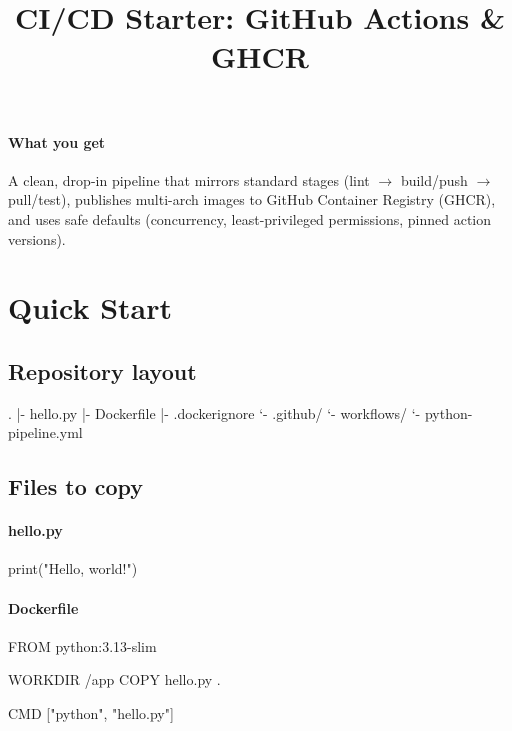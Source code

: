 \documentclass[11pt]{article}
\title{\textbf{CI/CD Starter: GitHub Actions \& GHCR}}
\author{}
\date{}
\begin{document}
\maketitle

\paragraph{What you get}
A clean, drop-in pipeline that mirrors standard stages (lint $\rightarrow$ build/push $\rightarrow$ pull/test), publishes multi-arch images to GitHub Container Registry (GHCR), and uses safe defaults (concurrency, least-privileged permissions, pinned action versions).

\section{Quick Start}

\subsection*{Repository layout}

\begin{mdframed}[style=codebox]
\begin{bashcode}
.
|- hello.py
|- Dockerfile
|- .dockerignore
`- .github/
   `- workflows/
      `- python-pipeline.yml
\end{bashcode}
\end{mdframed}

\subsection*{Files to copy}

\paragraph{hello.py}
\begin{mdframed}[style=codebox]
\begin{pythoncode}
print("Hello, world!")
\end{pythoncode}
\end{mdframed}

\paragraph{Dockerfile}
\begin{mdframed}[style=codebox]
\begin{dockercode}
FROM python:3.13-slim

WORKDIR /app
COPY hello.py .

CMD ["python", "hello.py"]
\end{dockercode}
\end{mdframed}
\end{document}
